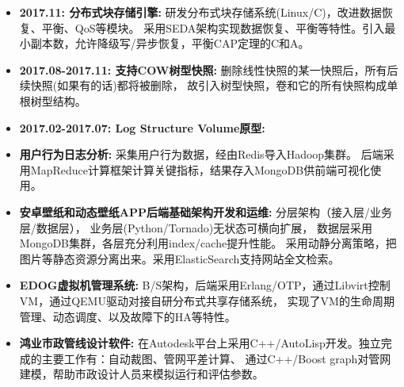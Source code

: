   \begin{itemize}[leftmargin=*]
      \item \textbf{2017.11: 分布式块存储引擎:} 研发分布式块存储系统(Linux/C)，改进数据恢复、平衡、QoS等模块。
          采用SEDA架构实现数据恢复、平衡等特性。引入最小副本数，允许降级写/异步恢复，平衡CAP定理的C和A。

      \item \textbf{2017.08-2017.11: 支持COW树型快照:} 删除线性快照的某一快照后，所有后续快照(如果有的话)都将被删除，
          故引入树型快照，卷和它的所有快照构成单根树型结构。

      \item \textbf{2017.02-2017.07: Log Structure Volume原型:}

      \item \textbf{用户行为日志分析:} 采集用户行为数据，经由Redis导入Hadoop集群。
          后端采用MapReduce计算框架计算关键指标，结果存入MongoDB供前端可视化使用。

      \item \textbf{安卓壁纸和动态壁纸APP后端基础架构开发和运维:} 分层架构（接入层/业务层/数据层），
          业务层(Python/Tornado)无状态可横向扩展，
          数据层采用MongoDB集群，各层充分利用index/cache提升性能。
          采用动静分离策略，把图片等静态资源分离出来。采用ElasticSearch支持网站全文检索。

      \item \textbf{EDOG虚拟机管理系统:} B/S架构，后端采用Erlang/OTP，通过Libvirt控制VM，通过QEMU驱动对接自研分布式共享存储系统，
          实现了VM的生命周期管理、动态调度、以及故障下的HA等特性。

      \item \textbf{鸿业市政管线设计软件:} 在Autodesk平台上采用C++/AutoLisp开发。独立完成的主要工作有：自动裁图、管网平差计算、
          通过C++/Boost graph对管网建模，帮助市政设计人员来模拟运行和评估参数。

  \end{itemize}

